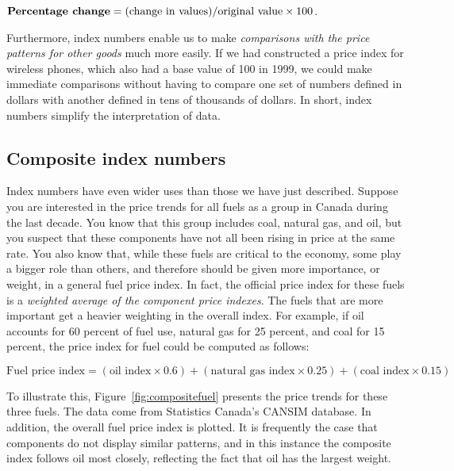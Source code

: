 \begin{DefBox}
$\text{\textbf{Percentage change}}=(\text{change in values})/\text{original value}\times 100$.
\end{DefBox}

Furthermore, index numbers enable us to make \textit{comparisons with the price patterns for other goods} much more easily. If we had constructed a price index for wireless phones, which also had a base value of 100 in 1999, we could make immediate comparisons without having to compare one set of numbers defined in dollars with another defined in tens of thousands of dollars. In short, index numbers simplify the interpretation of data.

\subsection*{Composite index numbers}

Index numbers have even wider uses than those we have just described. Suppose you are interested in the price trends for all fuels as a group in Canada during the last decade. You know that this group includes coal, natural gas, and oil, but you suspect that these components have not all been rising in price at the same rate. You also know that, while these fuels are critical to the economy, some play a bigger role than others, and therefore should be given more importance, or weight, in a general fuel price index. In fact, the official price index for these fuels is a \textit{weighted average of the component price indexes}. The fuels that are more important get a heavier weighting in the overall index. For example, if oil accounts for 60 percent of fuel use, natural gas for 25 percent, and coal for 15 percent, the price index for fuel could be computed as follows:

\begin{equation} \label{eq:fuelpriceindex}
\text{Fuel price index}=(\text{oil index}\times 0.6)+(\text{natural gas index}\times 0.25)+(\text{coal index}\times 0.15)
\end{equation}

To illustrate this, Figure~\ref{fig:compositefuel} presents the price trends for these three fuels. The data come from Statistics Canada's CANSIM database. In addition, the overall fuel price index is plotted. It is frequently the case that components do not display similar patterns, and in this instance the composite index follows oil most closely, reflecting the fact that oil has the largest weight.

